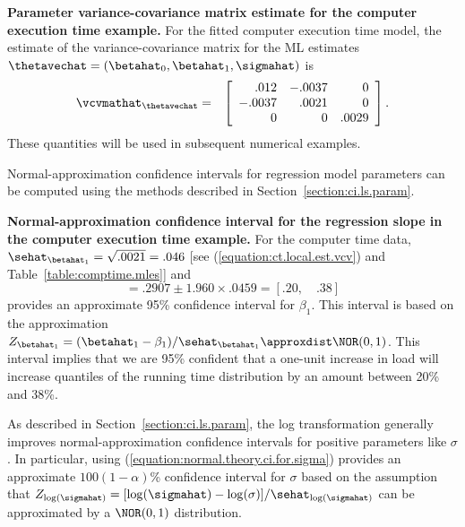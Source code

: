 \begin{example}
\label{example:parvarcovarmatest}
{\bf Parameter variance-covariance matrix estimate for the computer
execution time example.} For the fitted 
computer execution time model, the
estimate of the variance-covariance matrix for the ML estimates
$\thetavechat=(\betahat_{0},\betahat_{1},\sigmahat)$ is
\begin{eqnarray}
\label{equation:ct.local.est.vcv}
\vcvmathat_{\thetavechat} &=&
\left[ 
\begin{array}{rrr}
.012     &-.0037 &0\\
-.0037 &.0021    &0\\
0&0&.0029
\end{array}
\right].
\end{eqnarray}
These quantities will be used in subsequent numerical examples.
\end{example}

Normal-approximation confidence intervals for regression model
parameters can be computed using the methods described in
Section~\ref{section:ci.ls.param}.

\begin{example}
\label{example:normal.theory.ci.for.ct.beta1}
{\bf Normal-approximation confidence interval for the regression
slope in the computer execution time example.} For the computer time
data, $\sehat_{\betahat_{1}}=\sqrt{.0021}=.046$ [see
(\ref{equation:ct.local.est.vcv}) and
Table~\ref{table:comptime.mles}] and
\begin{displaymath}
 [\undertilde{\beta_{1}},\quad \tilde{\beta_{1}}] =
 .2907 \pm  1.960 \times .0459  = [.20, \quad .38]
\end{displaymath}
provides an approximate 95\% confidence interval for $\beta_{1}$.
This interval is based on the approximation
$Z_{\betahat_{1}}=(\betahat_{1}-\beta_{1})/\sehat_{\betahat_{1}}
\approxdist
\NOR(0,1)$.
This interval implies that we are 95\% confident that a one-unit
increase in load will increase quantiles of the running time
distribution by an amount between 20\% and 38\%.
\end{example}

As described in Section~\ref{section:ci.ls.param}, the log
transformation generally improves normal-approximation confidence
intervals for positive parameters like $\sigma$.  In particular,
using (\ref{equation:normal.theory.ci.for.sigma}) provides an
approximate $100(1-\alpha)$\% confidence interval for $\sigma$ based
on the assumption that
$Z_{\log(\sigmahat)}=[\log(\sigmahat)-\log(\sigma)]/\sehat_{\log(\sigmahat)}$
can be approximated by a $\NOR(0,1)$ distribution.

